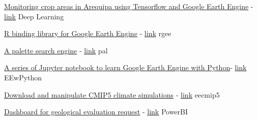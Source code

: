 \begin{cventries}
  \cventry
    {\href{https://csaybar.github.io/post/eetf2/}{Monitoring crop areas in Arequipa using Tensorflow and Google Earth Engine} - \textcolor{blue}{\href{https://csaybar.github.io/rgee/}{link}}
    }
    {Deep Learning}
    {}
    {}
    {
      \begin{cvitems}
      \end{cvitems}
    }
    \vspace{-25}
\end{cventries}
\begin{cventries}
  \cventry
    {\href{https://csaybar.github.io/rgee/}{R binding library for Google Earth Engine} - \textcolor{blue}{\href{https://csaybar.github.io/rgee/}{link}}
    }
    {rgee}
    {}
    {}
    {
      \begin{cvitems}
      \end{cvitems}
    }
    \vspace{-25}
\end{cventries}
\begin{cventries}
  \cventry
    {\href{https://github.com/csaybar/pal}{A palette search engine} - \textcolor{blue}{\href{https://rdrr.io/github/csaybar/pal/}{link}}}
    {pal}
    { }
    { }
    {
      \begin{cvitems}
      \end{cvitems}
    }
    \vspace{-15}
\end{cventries}
\begin{cventries}
\vspace{-4mm}
  \cventry
    {
    \href{https://github.com/csaybar/EEwPython}{A series of Jupyter notebook to learn Google Earth Engine with Python}- \textcolor{blue}{\href{https://github.com/csaybar/EEwPython}{link}}
    }
    {EEwPython}
    { }
    { }
    {
      \begin{cvitems}
      \end{cvitems}
    }
    \vspace{-20}
\end{cventries}
\begin{cventries}
  \cventry
    {
    \href{https://github.com/csaybar/eecmip5}{Download and manipulate CMIP5 climate simulations} - 
    \textcolor{blue}{\href{https://github.com/csaybar/eecmip5}{link}}
    }
    {eecmip5}
    { }
    { }
    {
      \begin{cvitems}
      \end{cvitems}
    }
    \vspace{-20}
\end{cventries}
\begin{cventries}
  \cventry
    {
    \href{https://geocatminapp.ingemmet.gob.pe/appdesa/tablero/Home/LoadReports?type=Solicitudes\%20DGAR&key=2\%7C2}{Dashboard for geological evaluation request} - 
    \textcolor{blue}{\href{https://geocatminapp.ingemmet.gob.pe/appdesa/tablero/Home/LoadReports?type=Solicitudes\%20DGAR&key=2\%7C2}{link}}
    }
    {PowerBI}
    { }
    { }
    {
      \begin{cvitems}
      \end{cvitems}
    }
    \vspace{-20}
\end{cventries}
